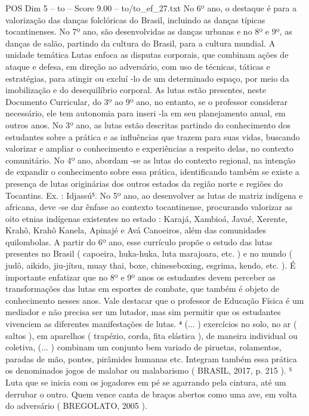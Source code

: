 \begin{textsample}{POS Dim 5 – to – Score 9.00 – to/to\_ef\_27.txt}
No 6º ano, o destaque é para a valorização das danças folclóricas do Brasil, incluindo as danças típicas tocantinenses.
No 7º ano, são desenvolvidas as danças urbanas e no 8º e 9º, as danças de salão, partindo da cultura do Brasil, para a cultura mundial.
A unidade temática Lutas enfoca as disputas corporais, que combinam ações de ataque e defesa, em direção ao adversário, com uso de técnicas, táticas e estratégias, para atingir ou excluí -lo de um determinado espaço, por meio da imobilização e do desequilíbrio corporal.
As lutas estão presentes, neste Documento Curricular, do 3º ao 9º ano, no entanto, se o professor considerar necessário, ele tem autonomia para inseri -la em seu planejamento anual, em outros anos.
No 3º ano, as lutas estão descritas partindo do conhecimento dos estudantes sobre a prática e as influências que trazem para suas vidas, buscando valorizar e ampliar o conhecimento e experiências a respeito delas, no contexto comunitário.
No 4º ano, abordam -se as lutas do contexto regional, na intenção de expandir o conhecimento sobre essa prática, identificando também se existe a presença de lutas originárias dos outros estados da região norte e regiões do Tocantins.
Ex. : Idjassú⁵.
No 5º ano, ao desenvolver as lutas de matriz indígena e africana, deve -se dar ênfase ao contexto tocantinense, procurando valorizar as oito etnias indígenas existentes no estado : Karajá, Xambioá, Javaé, Xerente, Krahô, Krahô Kanela, Apinajé e Avá Canoeiros, além das comunidades quilombolas.
A partir do 6º ano, esse currículo propõe o estudo das lutas presentes no Brasil ( capoeira, huka-huka, luta marajoara, etc. ) e no mundo ( judô, aikido, jiu-jítsu, muay thai, boxe, chineseboxing, esgrima, kendo, etc. ).
É importante enfatizar que no 8º e 9º anos os estudantes devem perceber as transformações das lutas em esportes de combate, que também é objeto de conhecimento nesses anos.
Vale destacar que o professor de Educação Física é um mediador e não precisa ser um lutador, mas sim permitir que os estudantes vivenciem as diferentes manifestações de lutas. ⁴ (... ) exercícios no solo, no ar ( saltos ), em aparelhos ( trapézio, corda, fita elástica ), de maneira individual ou coletiva, (... ) combinam um conjunto bem variado de piruetas, rolamentos, paradas de mão, pontes, pirâmides humanas etc.
Integram também essa prática os denominados jogos de malabar ou malabarismo ( BRASIL, 2017, p. 215 ). ⁵ Luta que se inicia com os jogadores em pé se agarrando pela cintura, até um derrubar o outro.
Quem vence canta de braços abertos como uma ave, em volta do adversário ( BREGOLATO, 2005 ).

\end{textsample}
